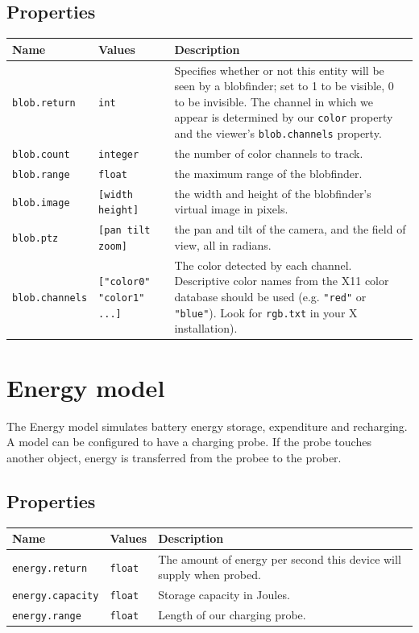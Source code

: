 \documentclass[letter,11pt,twoside]{report}
\begin{document}
\subsection*{Properties}
\begin{tabularx}{\columnwidth}{llX}
\hline Name & Values & Description \\ 
\hline 

\verb'blob.return' & \verb'int' & Specifies whether or not this entity
will be seen by a blobfinder; set to 1 to be visible, 0 to be
invisible. The channel in which we appear is determined by our
\verb'color' property and the viewer's \verb'blob.channels'
property.\\

\verb'blob.count' & \verb'integer' & the number of color channels to
track.\\

\verb'blob.range' & \verb'float' & the maximum range of the blobfinder.\\

\verb'blob.image' & \verb'[width height]' & the width and height of
the blobfinder's virtual image in pixels.\\

\verb'blob.ptz' & \verb'[pan tilt zoom]' & the pan and tilt of the
camera, and the field of view, all in radians.\\

\verb'blob.channels' & \verb'["color0" "color1" ...]' & The
color detected by each channel.  Descriptive
color names from the X11 color database should be used
(e.g. \verb'"red"' or \verb'"blue"').  Look for \verb'rgb.txt' in your
X installation).\\
\hline
\end{tabularx}

\newpage
\section{Energy model}

The Energy model simulates battery energy storage, expenditure and
recharging. A model can be configured to have a charging probe. If the
probe touches another object, energy is transferred from the probee to
the prober.

\subsection*{Properties}
\begin{tabularx}{\columnwidth}{llX}
\hline Name & Values & Description \\ 
\hline 

\verb'energy.return' & \verb'float' & The amount of energy per second
this device will supply when probed. \\
\verb'energy.capacity' & \verb'float' & Storage capacity in Joules.\\
\verb'energy.range' & \verb'float' & Length of our charging probe.\\
\hline
\end{tabularx}




\end{document}
